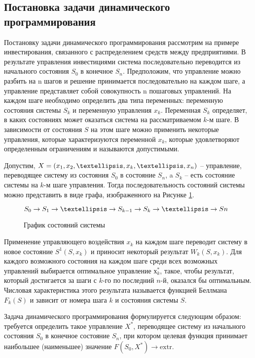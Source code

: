 \subsection{Постановка задачи динамического программирования}

Постановку задачи динамического программирования рассмотрим на примере инвестирования, связанного с распределением средств между предприятиями. В результате управления инвестициями система последовательно переводится из начального состояния $S_0$ в конечное $S_n$. Предположим, что управление можно разбить на n шагов и решение принимается последовательно на каждом шаге, а управление представляет собой совокупность n пошаговых управлений. На каждом шаге необходимо определить два типа переменных: переменную состояния системы $S_k$ и переменную управления $x_k$. Переменная $S_k$ определяет, в каких состояниях может оказаться система на рассматриваемом $k$-м шаге. В зависимости от состояния $S$ на этом шаге можно применить некоторые управления, которые характеризуются переменной $x_k$, которые удовлетворяют определенным ограничениям и называются допустимыми.

Допустим, $X = (x_1, x_2, \textellipsis, x_k, \textellipsis, x_n)$ – управление, переводящее систему из состояния $S_0$ в состояние $S_n$, a $S_k$ – есть состояние системы на $k$-м шаге управления. Тогда последовательность состояний системы можно представить в виде графа, изображенного на Рисунке \ref{sec:task:definition:system-state}.

\begin{figure}[h]
  \centering
    $S_0 \rightarrow S_1 \rightarrow \textellipsis \rightarrow S_{k-1} \rightarrow S_k \rightarrow \textellipsis \rightarrow Sn$
  \caption{График состояний системы}
  \label{sec:task:definition:system-state}
\end{figure}

Применение управляющего воздействия $x_k$ на каждом шаге переводит систему в новое состояние $S^1(S, x_k)$ и приносит некоторый результат $W_k (S, x_k)$. Для каждого возможного состояния на каждом шаге среди всех возможных управлений выбирается оптимальное управление $х^*_k$, такое, чтобы результат, который достигается за шаги с $k$-го по последний $n$-й, оказался бы оптимальным. Числовая характеристика этого результата называется функцией Беллмана $F_k(S)$ и зависит от номера шага $k$ и состояния системы $S$.

Задача динамического программирования формулируется следующим образом: требуется определить такое управление $X^*$, переводящее систему из начального состояния $S_0$ в конечное состояние $S_n$, при котором целевая функция принимает наибольшее (наименьшее) значение $F(S_0, X^*) \rightarrow \text{extr}$.

